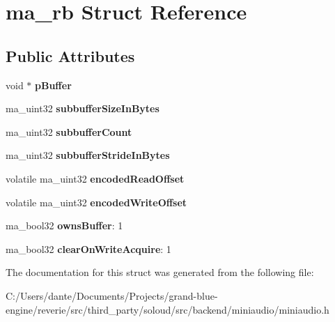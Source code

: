 \hypertarget{structma__rb}{}\section{ma\+\_\+rb Struct Reference}
\label{structma__rb}
\subsection*{Public Attributes}
\begin{DoxyCompactItemize}
\item 
\mbox{\label{structma__rb_a12e106765cc15b322c50d03cde158ba9}} 
void $\ast$ {\bfseries p\+Buffer}
\item 
\mbox{\label{structma__rb_a76755eecd3f8f4d2cf40a61d023538f1}} 
ma\+\_\+uint32 {\bfseries subbuffer\+Size\+In\+Bytes}
\item 
\mbox{\label{structma__rb_a6097d72dafeda1ae507a7e027f1641fc}} 
ma\+\_\+uint32 {\bfseries subbuffer\+Count}
\item 
\mbox{\label{structma__rb_a9d7dffc2cee1c0ec0c749f270d3664d0}} 
ma\+\_\+uint32 {\bfseries subbuffer\+Stride\+In\+Bytes}
\item 
\mbox{\label{structma__rb_aa33d595abd4b6eba68fc59cf9ec71816}} 
volatile ma\+\_\+uint32 {\bfseries encoded\+Read\+Offset}
\item 
\mbox{\label{structma__rb_a84baf1bcb9b3102b036551b04589b156}} 
volatile ma\+\_\+uint32 {\bfseries encoded\+Write\+Offset}
\item 
\mbox{\label{structma__rb_a09e2cd49004e01bd1fac6554c5d78508}} 
ma\+\_\+bool32 {\bfseries owns\+Buffer}\+: 1
\item 
\mbox{\label{structma__rb_ae94f700fb29e93c3f7d8a43faf9ec8a0}} 
ma\+\_\+bool32 {\bfseries clear\+On\+Write\+Acquire}\+: 1
\end{DoxyCompactItemize}


The documentation for this struct was generated from the following file\+:\begin{DoxyCompactItemize}
\item 
C\+:/\+Users/dante/\+Documents/\+Projects/grand-\/blue-\/engine/reverie/src/third\+\_\+party/soloud/src/backend/miniaudio/miniaudio.\+h\end{DoxyCompactItemize}

